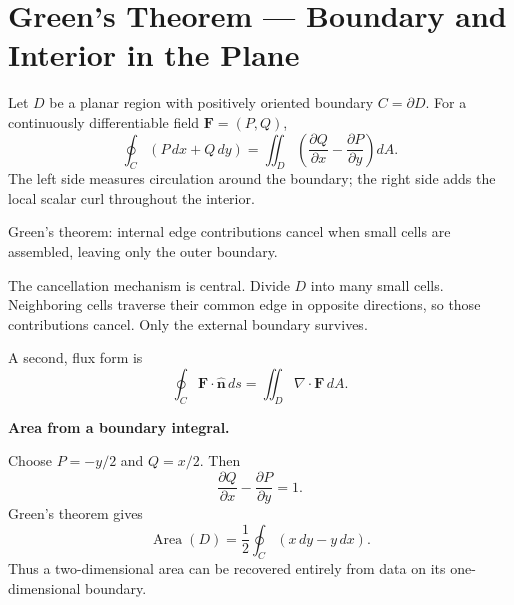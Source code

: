 \section{Green's Theorem --- Boundary and Interior in the Plane}
\label{sec:greens-theorem}

Let $D$ be a planar region with positively oriented boundary $C=\partial D$. For a continuously differentiable field $\mathbf F=(P,Q)$,
\[
\boxed{\oint_C(P\,dx+Q\,dy)=
\iint_D\left(\frac{\partial Q}{\partial x}-\frac{\partial P}{\partial y}\right)dA.}
\]
The left side measures circulation around the boundary; the right side adds the local scalar curl throughout the interior.

\begin{bookfigure}{Green's theorem: internal edge contributions cancel when small cells are assembled, leaving only the outer boundary.}

\label{fig:green-cells}
\end{bookfigure}

The cancellation mechanism is central. Divide $D$ into many small cells. Neighboring cells traverse their common edge in opposite directions, so those contributions cancel. Only the external boundary survives.

A second, flux form is
\[
\boxed{\oint_C\mathbf F\cdot\hat{\mathbf n}\,ds
=\iint_D\nabla\cdot\mathbf F\,dA.}
\]

\begin{workedexample}
\textbf{Area from a boundary integral.}\par
Choose $P=-y/2$ and $Q=x/2$. Then
\[
\frac{\partial Q}{\partial x}-\frac{\partial P}{\partial y}=1.
\]
Green's theorem gives
\[
\operatorname{Area}(D)=\frac12\oint_C(x\,dy-y\,dx).
\]
Thus a two-dimensional area can be recovered entirely from data on its one-dimensional boundary.
\end{workedexample}
